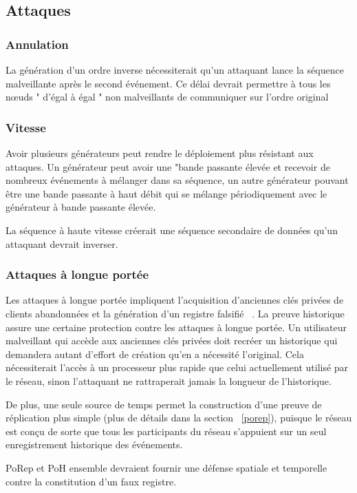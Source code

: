\documentclass[12pt]{article}
\begin{document}
\subsection{Attaques}
\subsubsection{Annulation}
 La génération d'un ordre inverse nécessiterait qu'un attaquant lance la séquence malveillante après le second événement. Ce délai devrait permettre à tous les nœuds  " d’égal à égal "  non malveillants de communiquer sur l'ordre original

\subsubsection{Vitesse}
Avoir plusieurs générateurs peut rendre le déploiement plus résistant aux attaques. Un générateur peut avoir une "bande passante élevée et recevoir de nombreux événements à mélanger dans sa séquence, un autre générateur pouvant être une bande passante à haut débit qui se mélange périodiquement avec le générateur à bande passante élevée.

La séquence à haute vitesse créerait une séquence secondaire de données qu'un attaquant devrait inverser.

\subsubsection{Attaques à longue portée}

Les attaques à longue portée impliquent l'acquisition d’anciennes clés privées de clients abandonnées et la génération d'un registre falsifié ~\cite{casper}. La preuve historique assure une certaine protection contre les attaques à longue portée. Un utilisateur malveillant qui accède aux anciennes clés privées doit recréer un historique qui demandera autant d'effort de création qu'en a nécessité l'original. Cela nécessiterait l'accès à un processeur plus rapide que celui actuellement utilisé par le réseau, sinon l'attaquant ne rattraperait jamais la longueur de l'historique.

De plus, une seule source de temps permet la construction d'une preuve de réplication plus simple (plus de détails dans la section ~\ref{porep}), puisque le réseau est conçu de sorte que tous les participants du réseau s'appuient sur un seul enregistrement historique des événements.

PoRep et PoH ensemble devraient fournir une défense spatiale et temporelle contre la constitution d'un faux registre.
\end{document}
